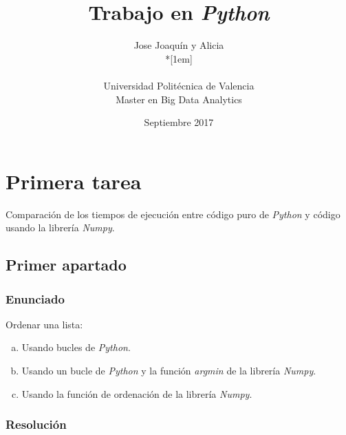 \documentclass[12pt,twoside]{article}
\title{Trabajo en \textit{Python}}
\author{Jose Joaquín y Alicia\\*[1em]
\begin{minipage}{0.75\textwidth}
\footnotesize \itshape
\begin{center}
Universidad Politécnica de Valencia \\
Master en Big Data Analytics
\end{center}
\end{minipage}
}
\date{Septiembre 2017}
\begin{document}
\maketitle
%



\section{Primera tarea}

Comparación de los tiempos de ejecución entre código puro de \textit{Python} y código usando la librería \textit{Numpy}.

\subsection{Primer apartado}

\subsubsection{Enunciado}

\noindent
Ordenar una lista:

\begin{enumerate}[(a)]

\item Usando bucles de \textit{Python}.

\item Usando un bucle de \textit{Python} y la función \textit{argmin} de la librería \textit{Numpy}.

\item Usando la función de ordenación de la librería \textit{Numpy}.

\end{enumerate}

\subsubsection{Resolución}
\end{document}
